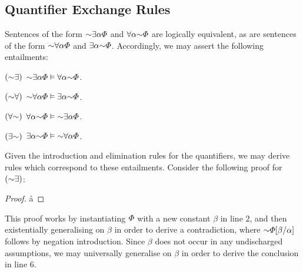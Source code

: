 \subsection{Quantifier Exchange Rules}

Sentences of the form $\enot\qt{\exists}{\alpha}\metaA$ and $\qt{\forall}{\alpha}\enot\metaA$ are logically equivalent, as are sentences of the form $\enot\qt{\forall}{\alpha}\metaA$ and $\qt{\exists}{\alpha}\enot\metaA$.
Accordingly, we may assert the following entailments: 

\vspace{.1in}
\begin{enumerate}[leftmargin=.75in]
  \begin{multicols}{2}
    \item[$(\enot\exists)$] $\enot\qt{\exists}{\alpha}\metaA \vDash \qt{\forall}{\alpha}\enot\metaA$.
    \item[$(\enot\forall)$] $\enot\qt{\forall}{\alpha}\metaA \vDash \qt{\exists}{\alpha}\enot\metaA$.
    \item[$(\forall\enot)$] $\qt{\forall}{\alpha}\enot\metaA \vDash \enot\qt{\exists}{\alpha}\metaA$.
    \item[$(\exists\enot)$] $\qt{\exists}{\alpha}\enot\metaA \vDash \enot\qt{\forall}{\alpha}\metaA$.
  \end{multicols}
\end{enumerate}
\vspace{-.05in}

Given the introduction and elimination rules for the quantifiers, we may derive rules which correspond to these entailments.
Consider the following proof for $(\enot\exists)$:

\begin{proof}
	      \pr{}
    \open
            
             
        \r{a}
    \close
       
         
\end{proof}

This proof works by instantiating $\varPhi$ with a new constant $\beta$ in line $2$, and then existentially generalising on $\beta$ in order to derive a contradiction, where $\enot\metaA\unisub{\beta}{\alpha}$ follows by negation introduction. 
Since $\beta$ does not occur in any undischarged assumptions, we may universally generalise on $\beta$ in order to derive the conclusion in line $6$. 


